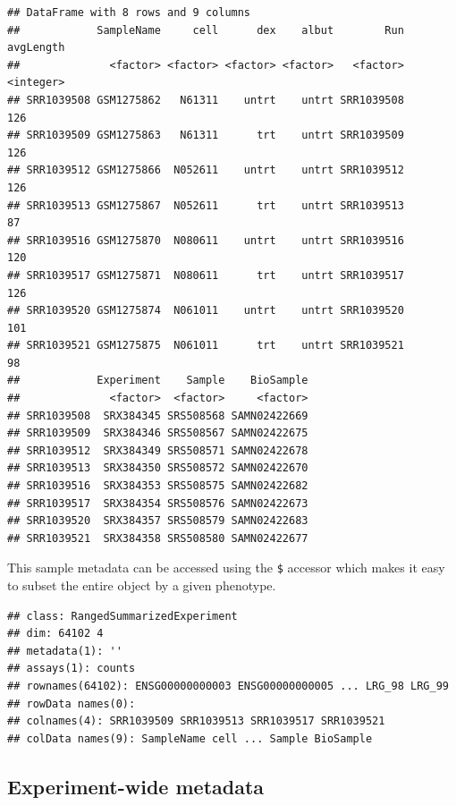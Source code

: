 \documentclass[]{article}
\newenvironment{Shaded}{\begin{snugshade}}{\end{snugshade}}
\newcommand{\CommentTok}[1]{\textcolor[rgb]{0.56,0.35,0.01}{\textit{#1}}}
\newcommand{\NormalTok}[1]{#1}
\newcommand{\OperatorTok}[1]{\textcolor[rgb]{0.81,0.36,0.00}{\textbf{#1}}}
\newcommand{\StringTok}[1]{\textcolor[rgb]{0.31,0.60,0.02}{#1}}
\begin{document}
\begin{verbatim}
## DataFrame with 8 rows and 9 columns
##            SampleName     cell      dex    albut        Run avgLength
##              <factor> <factor> <factor> <factor>   <factor> <integer>
## SRR1039508 GSM1275862   N61311    untrt    untrt SRR1039508       126
## SRR1039509 GSM1275863   N61311      trt    untrt SRR1039509       126
## SRR1039512 GSM1275866  N052611    untrt    untrt SRR1039512       126
## SRR1039513 GSM1275867  N052611      trt    untrt SRR1039513        87
## SRR1039516 GSM1275870  N080611    untrt    untrt SRR1039516       120
## SRR1039517 GSM1275871  N080611      trt    untrt SRR1039517       126
## SRR1039520 GSM1275874  N061011    untrt    untrt SRR1039520       101
## SRR1039521 GSM1275875  N061011      trt    untrt SRR1039521        98
##            Experiment    Sample    BioSample
##              <factor>  <factor>     <factor>
## SRR1039508  SRX384345 SRS508568 SAMN02422669
## SRR1039509  SRX384346 SRS508567 SAMN02422675
## SRR1039512  SRX384349 SRS508571 SAMN02422678
## SRR1039513  SRX384350 SRS508572 SAMN02422670
## SRR1039516  SRX384353 SRS508575 SAMN02422682
## SRR1039517  SRX384354 SRS508576 SAMN02422673
## SRR1039520  SRX384357 SRS508579 SAMN02422683
## SRR1039521  SRX384358 SRS508580 SAMN02422677
\end{verbatim}

This sample metadata can be accessed using the \texttt{\$} accessor
which makes it easy to subset the entire object by a given phenotype.

\begin{Shaded}
\end{Shaded}

\begin{verbatim}
## class: RangedSummarizedExperiment 
## dim: 64102 4 
## metadata(1): ''
## assays(1): counts
## rownames(64102): ENSG00000000003 ENSG00000000005 ... LRG_98 LRG_99
## rowData names(0):
## colnames(4): SRR1039509 SRR1039513 SRR1039517 SRR1039521
## colData names(9): SampleName cell ... Sample BioSample
\end{verbatim}

\hypertarget{experiment-wide-metadata}{%
\subsection{Experiment-wide metadata}\label{experiment-wide-metadata}}
\end{document}
